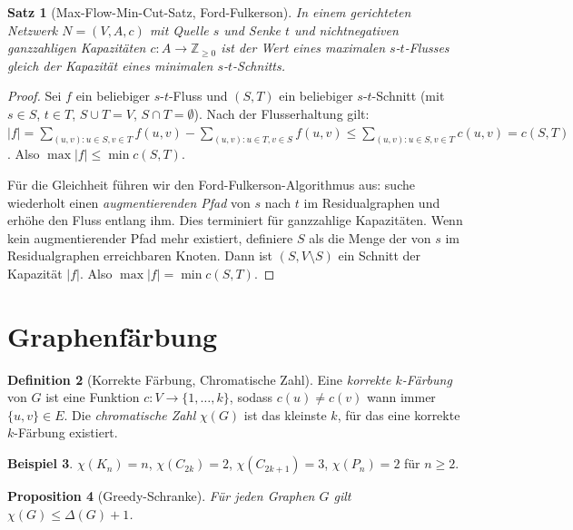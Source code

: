 \documentclass[12pt,a4paper]{amsart}
\newtheorem{theorem}{Satz}[section]
\newtheorem{proposition}[theorem]{Proposition}
\theoremstyle{definition}
\newtheorem{definition}[theorem]{Definition}
\newtheorem{example}[theorem]{Beispiel}
\theoremstyle{remark}
\newcommand{\Z}{\mathbb{Z}}
\newcommand{\chr}{\chi}
\begin{document}
\begin{theorem}[Max-Flow-Min-Cut-Satz, Ford-Fulkerson]
\label{satz:maxflow}
In einem gerichteten Netzwerk $N = (V, A, c)$ mit Quelle $s$ und Senke $t$
und nichtnegativen ganzzahligen Kapazitäten $c: A \to \Z_{\ge 0}$ ist der
Wert eines maximalen $s$-$t$-Flusses gleich der Kapazität eines minimalen
$s$-$t$-Schnitts.
\end{theorem}

\begin{proof}
Sei $f$ ein beliebiger $s$-$t$-Fluss und $(S, T)$ ein beliebiger $s$-$t$-Schnitt
(mit $s \in S$, $t \in T$, $S \cup T = V$, $S \cap T = \emptyset$). Nach der
Flusserhaltung gilt:
$|f| = \sum_{(u,v): u \in S, v \in T} f(u,v) - \sum_{(u,v): u \in T, v \in S} f(u,v)
\le \sum_{(u,v): u \in S, v \in T} c(u,v) = c(S,T)$.
Also $\max |f| \le \min c(S,T)$.

Für die Gleichheit führen wir den Ford-Fulkerson-Algorithmus aus: suche
wiederholt einen \emph{augmentierenden Pfad} von $s$ nach $t$ im Residualgraphen
und erhöhe den Fluss entlang ihm. Dies terminiert für ganzzahlige Kapazitäten.
Wenn kein augmentierender Pfad mehr existiert, definiere $S$ als die Menge
der von $s$ im Residualgraphen erreichbaren Knoten. Dann ist $(S, V \setminus S)$
ein Schnitt der Kapazität $|f|$. Also $\max |f| = \min c(S,T)$.
\end{proof}

\section{Graphenfärbung}
\label{sec:faerbung}

\begin{definition}[Korrekte Färbung, Chromatische Zahl]
Eine \emph{korrekte $k$-Färbung} von $G$ ist eine Funktion $c: V \to \{1, \ldots, k\}$,
sodass $c(u) \ne c(v)$ wann immer $\{u,v\} \in E$. Die \emph{chromatische Zahl}
$\chr(G)$ ist das kleinste $k$, für das eine korrekte $k$-Färbung existiert.
\end{definition}

\begin{example}
$\chr(K_n) = n$, $\chr(C_{2k}) = 2$, $\chr(C_{2k+1}) = 3$, $\chr(P_n) = 2$
für $n \ge 2$.
\end{example}

\begin{proposition}[Greedy-Schranke]
\label{prop:greedy}
Für jeden Graphen $G$ gilt $\chr(G) \le \Delta(G) + 1$.
\end{proposition}
\end{document}
